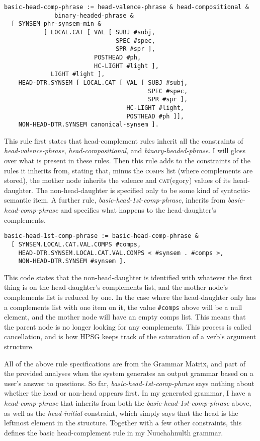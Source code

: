 \begin{verbatim}
basic-head-comp-phrase := head-valence-phrase & head-compositional &
              binary-headed-phrase &
  [ SYNSEM phr-synsem-min &
           [ LOCAL.CAT [ VAL [ SUBJ #subj,
                               SPEC #spec,
                               SPR #spr ],
                         POSTHEAD #ph,
                         HC-LIGHT #light ],
             LIGHT #light ],
    HEAD-DTR.SYNSEM [ LOCAL.CAT [ VAL [ SUBJ #subj,
                                        SPEC #spec,
                                        SPR #spr ],
                                  HC-LIGHT #light,
                                  POSTHEAD #ph ]],
    NON-HEAD-DTR.SYNSEM canonical-synsem ].
\end{verbatim}

This rule first states that head-complement rules inherit all the constraints of \textit{head-valence-phrase}, \textit{head-compositional}, and \textit{binary-headed-phrase}. I will gloss over what is present in these rules. Then this rule adds to the constraints of the rules it inherits from, stating that, minus the \textsc{comps} list (where complements are stored), the mother node inherits the valence and \textsc{cat}(egory) values of its head-daughter. The non-head-daughter is specified only to be some kind of syntactic-semantic item. A further rule, \textit{basic-head-1st-comp-phrase}, inherits from \textit{basic-head-comp-phrase} and specifies what happens to the head-daughter's complements.

\begin{verbatim}
basic-head-1st-comp-phrase := basic-head-comp-phrase &
  [ SYNSEM.LOCAL.CAT.VAL.COMPS #comps,
    HEAD-DTR.SYNSEM.LOCAL.CAT.VAL.COMPS < #synsem . #comps >,
    NON-HEAD-DTR.SYNSEM #synsem ].
\end{verbatim}

This code states that the non-head-daughter is identified with whatever the first thing is on the head-daughter's complements list, and the mother node's complements list is reduced by one. In the case where the head-daughter only has a complements list with one item on it, the value \texttt{\#comps} above will be a null element, and the mother node will have an empty comps list. This means that the parent node is no longer looking for any complements. This process is called cancellation, and is how HPSG keeps track of the saturation of a verb's argument structure.

All of the above rule specifications are from the Grammar Matrix, and part of the provided analyses when the system generates an output grammar based on a user's answer to questions. So far, \textit{\justify basic-head-1st-comp-phrase} says nothing about whether the head or non-head appears first. In my generated grammar, I have a \textit{head-comp-phrase} that inherits from both the \textit{\justify basic-head-1st-comp-phrase} above, as well as the \textit{head-initial} constraint, which simply says that the head is the leftmost element in the structure. Together with a few other constraints, this defines the basic head-complement rule in my Nuuchahnulth grammar.

